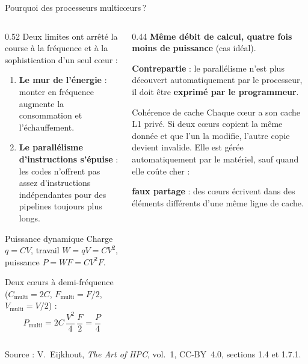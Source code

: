 \documentclass[8pt,aspectratio=169]{beamer}
\newcommand{\src}[1]{\vfill{\tiny\color{gray}Source : #1\par}}
\newcommand{\eij}{V.~Eijkhout, \emph{The Art of HPC}, vol.~1, CC-BY~4.0}
\begin{document}
\begin{frame}{Pourquoi des processeurs multicœurs\,?}
\begin{columns}[T]
\begin{column}{0.52\textwidth}
Deux limites ont arrêté la course à la fréquence et à la sophistication d'un seul cœur :
\begin{enumerate}
\item \textbf{Le mur de l'énergie} : monter en fréquence augmente la consommation et l'échauffement.
\item \textbf{Le parallélisme d'instructions s'épuise} : les codes n'offrent pas assez d'instructions indépendantes pour des pipelines toujours plus longs.
\end{enumerate}

\medskip
\begin{block}{Puissance dynamique}
Charge $q=CV$, travail $W=qV=CV^2$, puissance $P = W F = C V^2 F$.

\smallskip
Deux cœurs à demi-fréquence ($C_{\text{multi}}=2C$, $F_{\text{multi}}=F/2$, $V_{\text{multi}}=V/2$) :
\[
P_{\text{multi}} = 2C\,\frac{V^2}{4}\,\frac{F}{2} = \frac{P}{4}
\]
\end{block}
\end{column}
\begin{column}{0.44\textwidth}
\textbf{Même débit de calcul, quatre fois moins de puissance} (cas idéal).

\medskip
\textbf{Contrepartie} : le parallélisme n'est plus découvert automatiquement par le processeur, il doit être \textbf{exprimé par le programmeur}.

\medskip
\begin{alertblock}{Cohérence de cache}
Chaque cœur a son cache L1 privé. Si deux cœurs copient la même donnée et que l'un la modifie, l'autre copie devient invalide. Elle est gérée automatiquement par le matériel, sauf quand elle coûte cher :

\smallskip
\textbf{faux partage} : des cœurs écrivent dans des éléments différents d'une même ligne de cache.
\end{alertblock}
\end{column}
\end{columns}
\src{\eij{}, sections 1.4 et 1.7.1.}
\end{frame}
\end{document}
